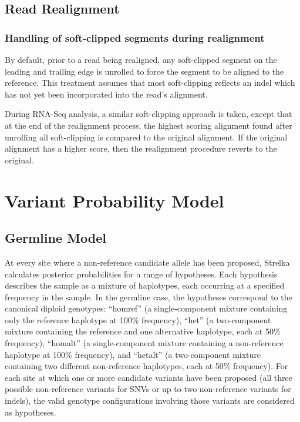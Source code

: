 \documentclass{article}
\begin{document}
\subsection{Read Realignment}

\subsubsection{Handling of soft-clipped segments during realignment}

By default, prior to a read being realigned, any soft-clipped segment on the leading and trailing edge is unrolled to force the segment to be aligned to the reference. This treatment assumes that most soft-clipping reflects an indel which has not yet been incorporated into the read's alignment.

During RNA-Seq analysis, a similar soft-clipping approach is taken, except that at the end of the realignment process, the highest scoring alignment found after unrolling all soft-clipping is compared to the original alignment. If the original alignment has a higher score, then the realignment procedure reverts to the original.



\section{Variant Probability Model}
\subsection{Germline Model}
\label{sec:germline}
At every site where a non-reference candidate allele has been proposed, Strelka calculates posterior probabilities for a range of hypotheses. Each hypothesis describes the sample as a mixture of haplotypes, each occurring at a specified frequency in the sample. In the germline case, the hypotheses correspond to the canonical diploid genotypes: ``homref'' (a single-component mixture containing only the reference haplotype at 100\% frequency), ``het'' (a two-component mixture containing the reference and one alternative haplotype, each at 50\% frequency), ``homalt'' (a single-component mixture containing a non-reference haplotype at 100\% frequency), and ``hetalt'' (a two-component mixture containing two different non-reference haplotypes, each at 50\% frequency). For each site at which one or more candidate variants have been proposed (all three possible non-reference variants for SNVs or up to two non-reference variants for indels), the valid genotype configurations involving those variants are considered as hypotheses. 
\end{document}
